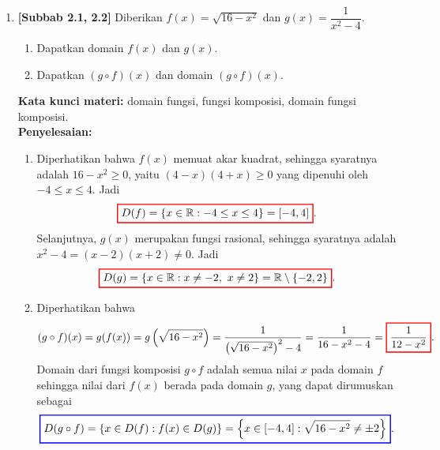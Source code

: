 \documentclass[10pt,openany,a4paper]{article}
\theoremstyle{definition}
\theoremstyle{definition}
\theoremstyle{plain}
\newenvironment{jawab}[2][tes]{%
\par\noindent\textbf{Kata kunci materi:} #1.\\
\textbf{Penyelesaian:} #2%
}{}
\begin{document}
\begin{enumerate}
    \item \textbf{[Subbab 2.1, 2.2]} Diberikan $f(x)=\sqrt{16-x^2}$ dan $g(x)=\dfrac{1}{x^2-4}$.
    \begin{enumerate}
        \item Dapatkan domain $f(x)$ dan $g(x)$.
        \item Dapatkan $(g\circ f)(x)$ dan domain $(g\circ f)(x)$.
    \end{enumerate}
    \begin{jawab}[domain fungsi, fungsi komposisi, domain fungsi komposisi]{
        \begin{enumerate}
            \item Diperhatikan bahwa $f(x)$ memuat akar kuadrat, sehingga syaratnya adalah $16-x^2\geq 0$, yaitu $(4-x)(4+x)\geq 0$ yang dipenuhi oleh $-4\leq x\leq 4$. Jadi
            \begin{align*}
                \colorlet{oldcolor}{.}
        \color{red}
        \setlength{\fboxrule}{1pt} \boxed{\color{oldcolor}D(f)=\{x\in\mathbb{R} : -4\leq x\leq 4\}=[-4,4]}\color{oldcolor}.
            \end{align*}
            Selanjutnya, $g(x)$ merupakan fungsi rasional, sehingga syaratnya adalah $x^2-4=(x-2)(x+2)\neq 0$. Jadi
            \begin{align*}
                \colorlet{oldcolor}{.}
        \color{red}
        \setlength{\fboxrule}{1pt} \boxed{\color{oldcolor}D(g)=\{x\in\mathbb{R} : x\neq -2,~x\neq 2\}=\mathbb{R}\setminus\{-2,2\}}\color{oldcolor}.
            \end{align*}
            \item Diperhatikan bahwa
            \begin{align*}
                (g\circ f)(x) = g(f(x)) = g\left(\sqrt{16-x^2}\right) = \frac{1}{\left(\sqrt{16-x^2}\right)^2-4} = \frac{1}{16-x^2-4} = \colorlet{oldcolor}{.}
        \color{red}
        \setlength{\fboxrule}{1pt} \boxed{\color{oldcolor}\frac{1}{12-x^2}}\color{oldcolor}.
            \end{align*}
            Domain dari fungsi komposisi $g\circ f$ adalah semua nilai $x$ pada domain $f$ sehingga nilai dari $f(x)$ berada pada domain $g$, yang dapat dirumuskan sebagai
            \begin{align*}
                \colorlet{oldcolor}{.}
        \color{blue}
        \setlength{\fboxrule}{1pt} \boxed{\color{oldcolor}D(g\circ f) = \{x \in D(f) : f(x) \in D(g)\} = \left\{x \in [-4,4] : \sqrt{16-x^2} \neq \pm 2\right\}}\color{oldcolor}.
            \end{align*}

\end{enumerate}}
\end{jawab}
\end{enumerate}
\end{document}
